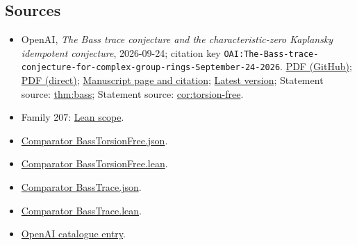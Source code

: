\documentclass[11pt]{article}
\begin{document}
\subsection{Sources}
\begin{itemize}
\item OpenAI, \emph{The Bass trace conjecture and the characteristic-zero Kaplansky idempotent conjecture}, 2026-09-24; citation key \texttt{OAI:The-Bass-trace-conjecture-for-complex-group-rings-September-24-2026}. \href{https://github.com/openai/math/blob/adc7f1241b42e322a6451854ab7e4b4c146bf78a/preprints/The-Bass-trace-conjecture-for-complex-group-rings-September-24-2026/The-Bass-trace-conjecture-for-complex-group-rings-September-24-2026.pdf}{PDF (GitHub)}; \href{https://github.com/openai/math/raw/adc7f1241b42e322a6451854ab7e4b4c146bf78a/preprints/The-Bass-trace-conjecture-for-complex-group-rings-September-24-2026/The-Bass-trace-conjecture-for-complex-group-rings-September-24-2026.pdf}{PDF (direct)}; \href{https://github.com/openai/math/blob/adc7f1241b42e322a6451854ab7e4b4c146bf78a/preprints/The-Bass-trace-conjecture-for-complex-group-rings-September-24-2026/README.md}{Manuscript page and citation}; \href{https://github.com/openai/math/blob/main/preprints/The-Bass-trace-conjecture-for-complex-group-rings-September-24-2026/The-Bass-trace-conjecture-for-complex-group-rings-September-24-2026.pdf}{Latest version}; Statement source: \href{https://github.com/openai/math/blob/adc7f1241b42e322a6451854ab7e4b4c146bf78a/preprints/The-Bass-trace-conjecture-for-complex-group-rings-September-24-2026/build/sections/01-introduction.tex\#L45}{thm:bass}; Statement source: \href{https://github.com/openai/math/blob/adc7f1241b42e322a6451854ab7e4b4c146bf78a/preprints/The-Bass-trace-conjecture-for-complex-group-rings-September-24-2026/build/sections/01-introduction.tex\#L98}{cor:torsion-free}.
\item Family 207: \href{https://github.com/openai/math/blob/adc7f1241b42e322a6451854ab7e4b4c146bf78a/lean/docs/207.md}{Lean scope}.
\item \href{https://github.com/openai/math/blob/adc7f1241b42e322a6451854ab7e4b4c146bf78a/lean/ComparatorChallenges/BassTorsionFree.json}{Comparator BassTorsionFree.json}.
\item \href{https://github.com/openai/math/blob/adc7f1241b42e322a6451854ab7e4b4c146bf78a/lean/ComparatorChallenges/BassTorsionFree.lean}{Comparator BassTorsionFree.lean}.
\item \href{https://github.com/openai/math/blob/adc7f1241b42e322a6451854ab7e4b4c146bf78a/lean/ComparatorChallenges/BassTrace.json}{Comparator BassTrace.json}.
\item \href{https://github.com/openai/math/blob/adc7f1241b42e322a6451854ab7e4b4c146bf78a/lean/ComparatorChallenges/BassTrace.lean}{Comparator BassTrace.lean}.
\item \href{https://github.com/openai/math/blob/adc7f1241b42e322a6451854ab7e4b4c146bf78a/CONTENTS.md}{OpenAI catalogue entry}.
\end{itemize}
\end{document}
